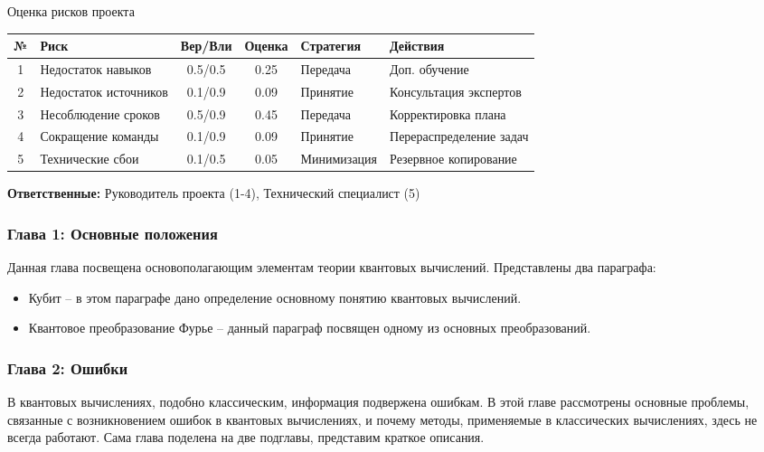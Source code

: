 \documentclass{beamer}
\begin{document}
\begin{frame}{Оценка рисков проекта}
\scriptsize
\setlength{\tabcolsep}{3pt}
\begin{tabular}{|c|l|c|c|p{2cm}|p{2.5cm}|}
	\hline
	\textbf{№} & \textbf{Риск} & \textbf{Вер/Вли} & \textbf{Оценка} & \textbf{Стратегия} & \textbf{Действия} \\
	\hline
	1 & Недостаток навыков & 0.5/0.5 & 0.25 & Передача & Доп. обучение \\
	\hline
	2 & Недостаток источников& 0.1/0.9 & 0.09 & Принятие & Консультация экспертов \\
	\hline
	3 & Несоблюдение сроков & 0.5/0.9 & 0.45 & Передача & Корректировка плана \\
	\hline
	4 & Сокращение команды & 0.1/0.9 & 0.09 & Принятие & Перераспределение задач \\
	\hline
	5 & Технические сбои & 0.1/0.5 & 0.05 & Минимизация & Резервное копирование \\
	\hline
\end{tabular}

\footnotesize
\textbf{Ответственные:} Руководитель проекта (1-4), Технический специалист (5)
\end{frame}
	\begin{frame}\frametitle{Глава 1: Основные положения}
		\justifying
		Данная глава посвещена основополагающим элементам теории квантовых вычислений. Представлены два параграфа:
		\begin{itemize}
			\item \justifying Кубит -- в этом параграфе дано определение основному понятию квантовых вычислений.
			\item \justifying Квантовое преобразование Фурье -- данный параграф посвящен одному из основных преобразований.
		\end{itemize}
		
	\end{frame}	
	\begin{frame}\frametitle{Глава 2: Ошибки}
		\justifying
		В квантовых вычислениях, подобно классическим, информация подвержена ошибкам. В этой главе  рассмотрены основные проблемы, связанные с возникновением ошибок в квантовых вычислениях, и почему методы, применяемые в классических вычислениях, здесь не всегда работают. Сама глава поделена на две подглавы, представим краткое описания.
		
	\end{frame}
	
\end{document}
